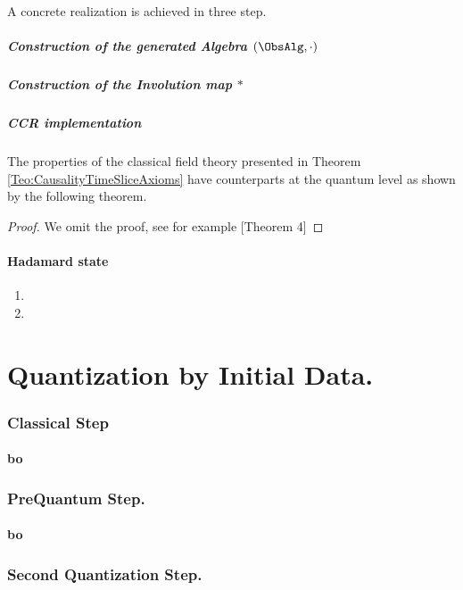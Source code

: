 \documentclass[Main]{subfiles}
\begin{document}
		A concrete realization is achieved in three step.
			\subparagraph{Construction of the generated Algebra $(\ObsAlg, \cdot)$}
   			
   			\subparagraph{Construction of the Involution map $*$}
   			
   			\subparagraph{CCR implementation}
   			
   			\begin{observation}
   				The properties of the classical field theory presented in Theorem \ref{Teo:CausalityTimeSliceAxioms} have counterparts at the quantum level as shown by the following theorem.
				\begin{theorem}
				
				\end{theorem}
				\begin{proof}
					We omit the proof, see for example \cite{benini}[Theorem 4]
				\end{proof}
   			\end{observation}
   			
   		\paragraph{Hadamard state} 
   				   	\begin{enumerate}
   						\item
   						\item
   					\end{enumerate}

\section{Quantization by Initial Data.}
	\subsubsection{Classical Step}
		\paragraph{bo}
	
	\subsubsection{PreQuantum Step.}
		\paragraph{bo}

	\subsubsection{Second Quantization Step.}
		
\end{document}
